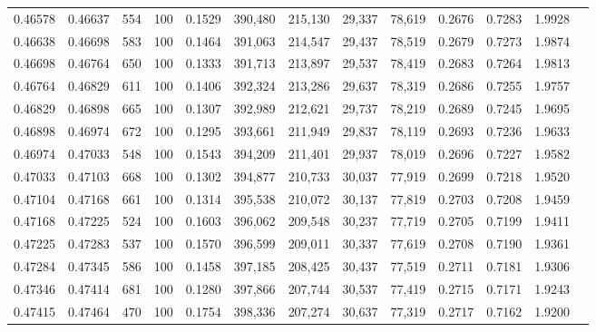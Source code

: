 \begin{tabular}{rrrrrrrrrrrrr}
0.46578 & 0.46637 &   554 & 100 &                                     0.1529 & 390,480 & 215,130 &  29,337 &  78,619 & 0.2676 & 0.7283 & 1.9928 \\
0.46638 & 0.46698 &   583 & 100 &                                     0.1464 & 391,063 & 214,547 &  29,437 &  78,519 & 0.2679 & 0.7273 & 1.9874 \\
0.46698 & 0.46764 &   650 & 100 &                                     0.1333 & 391,713 & 213,897 &  29,537 &  78,419 & 0.2683 & 0.7264 & 1.9813 \\
0.46764 & 0.46829 &   611 & 100 &                                     0.1406 & 392,324 & 213,286 &  29,637 &  78,319 & 0.2686 & 0.7255 & 1.9757 \\
0.46829 & 0.46898 &   665 & 100 &                                     0.1307 & 392,989 & 212,621 &  29,737 &  78,219 & 0.2689 & 0.7245 & 1.9695 \\
0.46898 & 0.46974 &   672 & 100 &                                     0.1295 & 393,661 & 211,949 &  29,837 &  78,119 & 0.2693 & 0.7236 & 1.9633 \\
0.46974 & 0.47033 &   548 & 100 &                                     0.1543 & 394,209 & 211,401 &  29,937 &  78,019 & 0.2696 & 0.7227 & 1.9582 \\
0.47033 & 0.47103 &   668 & 100 &                                     0.1302 & 394,877 & 210,733 &  30,037 &  77,919 & 0.2699 & 0.7218 & 1.9520 \\
0.47104 & 0.47168 &   661 & 100 &                                     0.1314 & 395,538 & 210,072 &  30,137 &  77,819 & 0.2703 & 0.7208 & 1.9459 \\
0.47168 & 0.47225 &   524 & 100 &                                     0.1603 & 396,062 & 209,548 &  30,237 &  77,719 & 0.2705 & 0.7199 & 1.9411 \\
0.47225 & 0.47283 &   537 & 100 &                                     0.1570 & 396,599 & 209,011 &  30,337 &  77,619 & 0.2708 & 0.7190 & 1.9361 \\
0.47284 & 0.47345 &   586 & 100 &                                     0.1458 & 397,185 & 208,425 &  30,437 &  77,519 & 0.2711 & 0.7181 & 1.9306 \\
0.47346 & 0.47414 &   681 & 100 &                                     0.1280 & 397,866 & 207,744 &  30,537 &  77,419 & 0.2715 & 0.7171 & 1.9243 \\
0.47415 & 0.47464 &   470 & 100 &                                     0.1754 & 398,336 & 207,274 &  30,637 &  77,319 & 0.2717 & 0.7162 & 1.9200 \\

\end{tabular}
